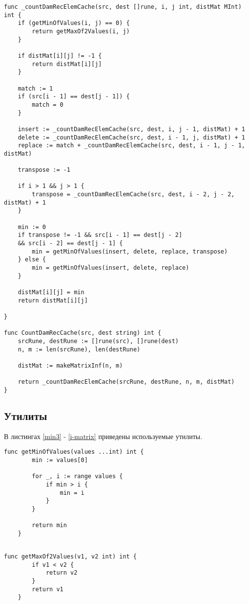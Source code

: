 \begin{lstlisting}[label=damer-lev-rec,caption=Программный код нахождения расстояния Дамерау\,--\,Левенштейна рекурсивно с кэшем]	
func _countDamRecElemCache(src, dest []rune, i, j int, distMat MInt) int {
	if (getMinOfValues(i, j) == 0) {
		return getMaxOf2Values(i, j)
	}
	
	if distMat[i][j] != -1 {
		return distMat[i][j]
	}
	
	match := 1
	if (src[i - 1] == dest[j - 1]) {
		match = 0
	}
	
	insert := _countDamRecElemCache(src, dest, i, j - 1, distMat) + 1
	delete := _countDamRecElemCache(src, dest, i - 1, j, distMat) + 1
	replace := match + _countDamRecElemCache(src, dest, i - 1, j - 1, distMat)
	
	transpose := -1
	
	if i > 1 && j > 1 {
		transpose = _countDamRecElemCache(src, dest, i - 2, j - 2, distMat) + 1
	}
	
	min := 0
	if transpose != -1 && src[i - 1] == dest[j - 2] 
	&& src[i - 2] == dest[j - 1] {
		min = getMinOfValues(insert, delete, replace, transpose)
	} else {
		min = getMinOfValues(insert, delete, replace)
	}
	
	distMat[i][j] = min
	return distMat[i][j]
	
}

func CountDamRecCache(src, dest string) int {
	srcRune, destRune := []rune(src), []rune(dest)
	n, m := len(srcRune), len(destRune)
	
	distMat := makeMatrixInf(n, m)
	
	return _countDamRecElemCache(srcRune, destRune, n, m, distMat)
}
\end{lstlisting}

\subsection{Утилиты}
В листингах \ref{min3} - \ref{i-matrix} приведены используемые утилиты.
\begin{lstlisting}[label=min3,caption=Функция нахождения минимума из N целых чисел]
	func getMinOfValues(values ...int) int {
		min := values[0]
		
		for _, i := range values {
			if min > i {
				min = i
			}
		}
		
		return min
	}
	
\end{lstlisting}

\begin{lstlisting}[label=max2,caption=Функция нахождения максимума из двух целых чисел]
	func getMaxOf2Values(v1, v2 int) int {
		if v1 < v2 {
			return v2
		}
		return v1
	}
\end{lstlisting}


